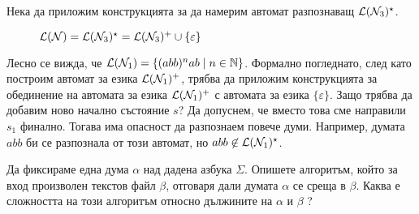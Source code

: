 \begin{example}
  Нека да приложим конструкцията за да намерим автомат разпознаващ $\mathcal{L}(\mathcal{N}_3)^\star$.

  \begin{figure}[H]
    \label{subf:a1}
    \center
    \caption{$\mathcal{L}(\mathcal{N}) = \mathcal{L}(\mathcal{N}_3)^\star = \mathcal{L}(\mathcal{N}_3)^+ \cup \{\varepsilon\}$}
  \end{figure}
    
  Лесно се вижда, че $\mathcal{L}(\mathcal{N}_1) = \{(abb)^nab\mid n\in\mathbb{N}\}$.
  Формално погледнато, след като построим автомат за езика $\mathcal{L}(\mathcal{N}_1)^+$, трябва да приложим
  конструкцията за обединение на автомата за езика $\mathcal{L}(\mathcal{N}_1)^+$ с автомата за езика $\{\varepsilon\}$.
  Защо трябва да добавим ново начално състояние $s$?
  Да допуснем, че вместо това сме направили $s_1$ финално.
  Тогава има опасност да разпознаем повече думи. Например, думата $abb$ би се разпознала от този автомат,
  но $abb \not\in\mathcal{L}(\mathcal{N}_1)^\star$.
  
\end{example}

\begin{problem}
  Да фиксираме една дума $\alpha$ над дадена азбука $\Sigma$.
  Опишете алгоритъм, който за вход произволен текстов файл $\beta$,
  отговаря дали думата $\alpha$ се среща в $\beta$.
  Каква е сложността на този алгоритъм относно дължините на $\alpha$ и $\beta$ ?
\end{problem}



